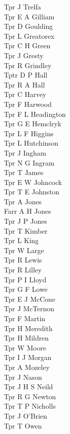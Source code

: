 \begin{multicols}{3}
  Tpr J Trelfa \\
  Tpr E A Gilliam \\
  Tpr D Goulding \\
  Tpr L Greatorex \\
  Tpr C H Green \\
  Tpr J Gresty \\
  Tpr R Grindley \\
  Tptr D P Hall \\
  Tpr R A Hall \\
  Tpr C Harvey \\
  Tpr F Harwood \\
  Tpr F L Headington \\
  Tpr G E Hemclryk \\
  Tpr L F Higgins \\
  Tpr L Hutchinson \\
  Tpr J Ingham \\
  Tpr N G Ingram \\
  Tpr T James \\
  Tpr E W Johncock \\
  Tpr T E Johnston \\
  Tpr A Jones \\
  Farr A H Jones \\
  Tpr J P Jones \\
  Tpr T Kimber \\
  Tpr L King \\
  Tpr W Large \\
  Tpr R Lewis \\
  Tpr R Lilley \\
  Tpr P I Lloyd \\
  Tpr G F Lowe \\
  Tpr E J McCone \\
  Tpr J McTernon \\
  Tpr F Martin \\
  Tpr H Meredith \\
  Tpr H Mildren \\
  Tpr W Moore \\
  Tpr I J Morgan \\
  Tpr A Mozeley \\
  Tpr J Nason \\
  Tpr J H S Neild \\
  Tpr R G Newton \\
  Tpr T P Nicholls \\
  Tpr J O'Brien \\
  Tpr T Owen \\

\end{multicols}
